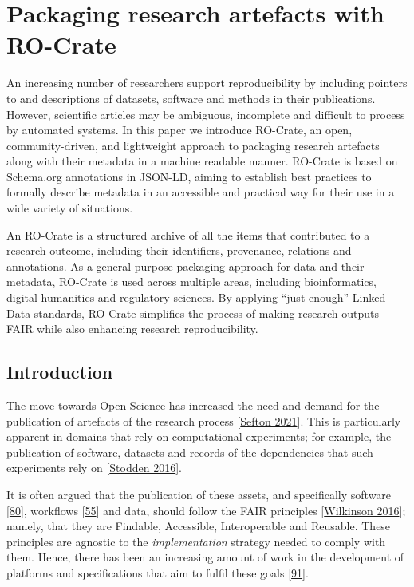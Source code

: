 \section{Packaging research artefacts with
RO-Crate}\label{packaging-research-artefacts-with-ro-crate}

An increasing number of researchers support reproducibility by including
pointers to and descriptions of datasets, software and methods in their
publications. However, scientific articles may be ambiguous, incomplete
and difficult to process by automated systems. In this paper we
introduce RO-Crate, an open, community-driven, and lightweight approach
to packaging research artefacts along with their metadata in a machine
readable manner. RO-Crate is based on Schema.org annotations in JSON-LD,
aiming to establish best practices to formally describe metadata in an
accessible and practical way for their use in a wide variety of
situations.

An RO-Crate is a structured archive of all the items that contributed to
a research outcome, including their identifiers, provenance, relations
and annotations. As a general purpose packaging approach for data and
their metadata, RO-Crate is used across multiple areas, including
bioinformatics, digital humanities and regulatory sciences. By applying
``just enough'' Linked Data standards, RO-Crate simplifies the process
of making research outputs FAIR while also enhancing research
reproducibility.



\hypertarget{introduction}{%
\subsection{Introduction}\label{introduction}}

The move towards Open Science has increased the need and demand for the
publication of artefacts of the research process
{[}\href{http://ptsefton.com/2021/04/07/rdmpic/}{Sefton 2021}{]}. This is
particularly apparent in domains that rely on computational experiments;
for example, the publication of software, datasets and records of the
dependencies that such experiments rely on
{[}\href{https://stodden.net/papers/ERCM2016-STODDEN.pdf}{Stodden 2016}{]}.

It is often argued that the publication of these assets, and
specifically software
{[}\href{https://doi.org/10.3233/DS-190026}{80}{]}, workflows
{[}\href{https://doi.org/10.1162/dint_a_00033}{55}{]} and data, should
follow the FAIR principles
{[}\href{https://doi.org/10.1038/sdata.2016.18}{Wilkinson 2016}{]}; namely, that
they are Findable, Accessible, Interoperable and Reusable. These
principles are agnostic to the \emph{implementation} strategy needed to
comply with them. Hence, there has been an increasing amount of work in
the development of platforms and specifications that aim to fulfil these
goals {[}\href{https://identifiers.org/isbn/9781315351148}{91}{]}.

